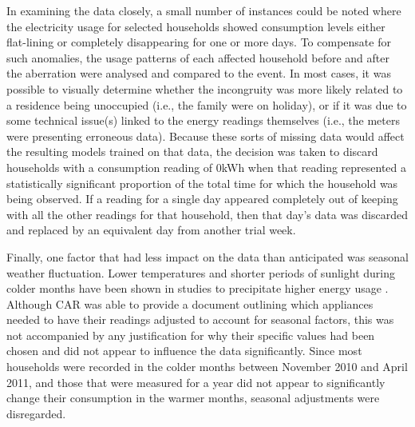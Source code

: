 \bigskip

\applianceTable


In examining the data closely, a small number of instances could be noted where the electricity usage for selected households showed consumption levels either flat-lining or completely disappearing for one or more days. To compensate for such anomalies, the usage patterns of each affected household before and after the aberration were analysed and compared to the event. In most cases, it was possible to visually determine whether the incongruity was more likely related to a residence being unoccupied (i.e., the family were on holiday), or if it was due to some technical issue(s) linked to the energy readings themselves (i.e., the meters were presenting erroneous data). Because these sorts of missing data would affect the resulting models trained on that data, the decision was taken to discard households with a consumption reading of 0kWh when that reading represented a statistically significant proportion of the total time for which the household was being observed.  If a reading for a single day appeared completely out of keeping with all the other readings for that household, then that day's data was discarded and replaced by an equivalent day from another trial week.

Finally, one factor that had less impact on the data than anticipated was seasonal weather fluctuation. Lower temperatures and shorter periods of sunlight during colder months have been shown in studies to precipitate higher energy usage \cite{DECC}. Although CAR was able to provide a document outlining which appliances needed to have their readings adjusted to account for seasonal factors, this was not accompanied by any justification for why their specific values had been chosen and did not appear to influence the data significantly. Since most households were recorded in the colder months between November 2010 and April 2011, and those that were measured for a year did not appear to significantly change their consumption in the warmer months, seasonal adjustments were disregarded.